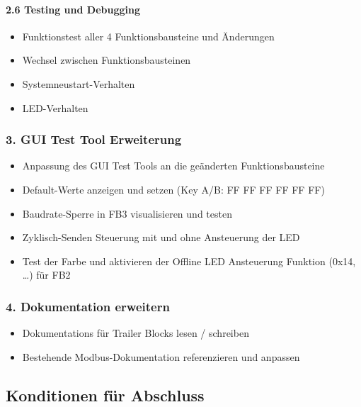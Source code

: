 \documentclass[a4paper,11pt]{article}
\providecommand{\tightlist}{\setlength{\itemsep}{0pt}\setlength{\parskip}{0pt}}
\begin{document}
\hypertarget{testing-und-debugging}{%
\paragraph{2.6 Testing und Debugging}\label{testing-und-debugging}}

\begin{itemize}
\tightlist
\item
  Funktionstest aller 4 Funktionsbausteine und Änderungen
\item
  Wechsel zwischen Funktionsbausteinen
\item
  Systemneustart-Verhalten
\item
  LED-Verhalten
\end{itemize}

\hypertarget{gui-test-tool-erweiterung}{%
\subsubsection{3. GUI Test Tool
Erweiterung}\label{gui-test-tool-erweiterung}}

\begin{itemize}
\tightlist
\item
  Anpassung des GUI Test Tools an die geänderten Funktionsbausteine
\item
  Default-Werte anzeigen und setzen (Key A/B: FF FF FF FF FF FF)
\item
  Baudrate-Sperre in FB3 visualisieren und testen
\item
  Zyklisch-Senden Steuerung mit und ohne Ansteuerung der LED
\item
  Test der Farbe und aktivieren der Offline LED Ansteuerung Funktion
  (0x14, \ldots) für FB2
\end{itemize}

\hypertarget{dokumentation-erweitern}{%
\subsubsection{4. Dokumentation
erweitern}\label{dokumentation-erweitern}}

\begin{itemize}
\tightlist
\item
  Dokumentations für Trailer Blocks lesen / schreiben
\item
  Bestehende Modbus-Dokumentation referenzieren und anpassen
\end{itemize}

\hypertarget{konditionen-fuxfcr-abschluss}{%
\subsection{Konditionen für
Abschluss}\label{konditionen-fuxfcr-abschluss}}
\end{document}
